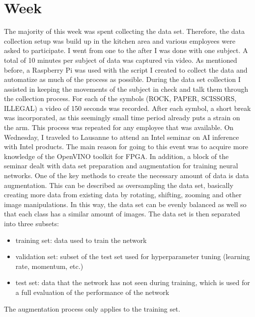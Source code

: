 \chapter{Week}
The majority of this week was spent collecting the data set. Therefore, the data collection setup was build up in the kitchen area and various employees were asked to participate. I went from one to the after I was done with one subject. A total of 10 minutes per subject of data was captured via video. As mentioned before, a Raspberry Pi was used with the script I created to collect the data and automatize as much of the process as possible. During the data set collection I assisted in keeping the movements of the subject in check and talk them through the collection process. For each of the symbols (ROCK, PAPER, SCISSORS, ILLEGAL) a video of 150 seconds was recorded. After each symbol, a short break was incorporated, as this seemingly small time period already puts a strain on the arm. This process was repeated for any employee that was available.
On Wednesday, I traveled to Lausanne to attend an Intel seminar on \ac{AI} inference with Intel products. The main reason for going to this event was to acquire more knowledge of the OpenVINO toolkit for \ac{FPGA}. In addition, a block of the seminar dealt with data set preparation and augmentation for training neural networks. One of the key methods to create the necessary amount of data is data augmentation. This can be described as oversampling the data set, basically creating more data from existing data by rotating, shifting, zooming and other image manipulations. In this way, the data set can be evenly balanced as well so that each class has a similar amount of images. The data set is then separated into three subsets:
\begin{itemize}
	\item training set: data used to train the network
	\item validation set: subset of the test set used for hyperparameter tuning (learning rate, momentum, etc.)
	\item test set: data that the network has not seen during training, which is used for a full evaluation of the performance of the network
\end{itemize}
The augmentation process only applies to the training set.
